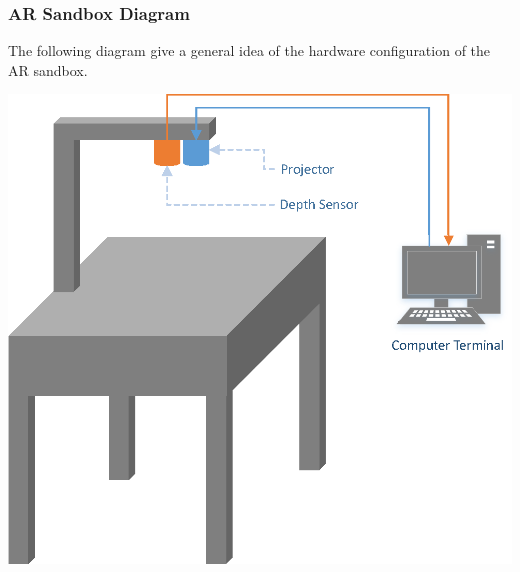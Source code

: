 \pagebreak

\subsubsection{AR Sandbox Diagram}
The following diagram give a general idea of the hardware configuration of the AR sandbox.
\begin{center}
\includegraphics[width=6in]{PhysicalDiagram}
\end{center}
